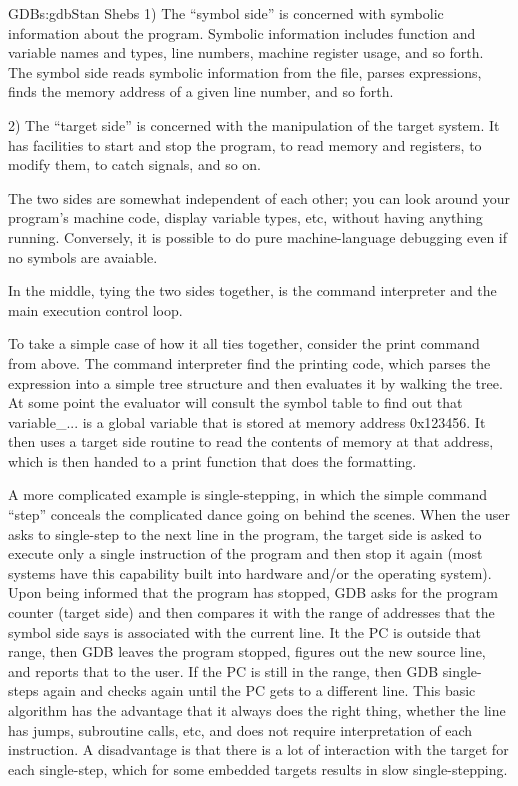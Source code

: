\begin{aosachapter}{GDB}{s:gdb}{Stan Shebs}
1) The ``symbol side'' is concerned with symbolic information about
the program.  Symbolic information includes function and variable
names and types, line numbers, machine register usage, and so forth.
The symbol side reads symbolic information from the file, parses
expressions, finds the memory address of a given line number, and so
forth.

2) The ``target side'' is concerned with the manipulation of the
target system.  It has facilities to start and stop the program, to
read memory and registers, to modify them, to catch signals, and so
on.

The two sides are somewhat independent of each other; you can look
around your program's machine code, display variable types, etc,
without having anything running.  Conversely, it is possible to do
pure machine-language debugging even if no symbols are avaiable.

In the middle, tying the two sides together, is the command interpreter
and the main execution control loop.

To take a simple case of how it all ties together, consider the
print command from above.  The command interpreter find the printing
code, which parses the expression into a simple tree structure and
then evaluates it by walking the tree.  At some point the evaluator
will consult the symbol table to find out that variable\_... is a global
variable that is stored at memory address 0x123456.  It then uses a
target side routine to read the contents of memory at that address,
which is then handed to a print function that does the formatting.

A more complicated example is single-stepping, in which the simple
command ``step'' conceals the complicated dance going on behind the
scenes.  When the user asks to single-step to the next line in the
program, the target side is asked to execute only a single instruction
of the program and then stop it again (most systems have this
capability built into hardware and/or the operating system).  Upon
being informed that the program has stopped, GDB asks for the program
counter (target side) and then compares it with the range of addresses
that the symbol side says is associated with the current line.  It the
PC is outside that range, then GDB leaves the program stopped, figures
out the new source line, and reports that to the user.  If the PC is
still in the range, then GDB single-steps again and checks again until
the PC gets to a different line.  This basic algorithm has the
advantage that it always does the right thing, whether the line has
jumps, subroutine calls, etc, and does not require interpretation of
each instruction.  A disadvantage is that there is a lot of interaction
with the target for each single-step, which for some embedded targets
results in slow single-stepping.


\end{aosachapter}
